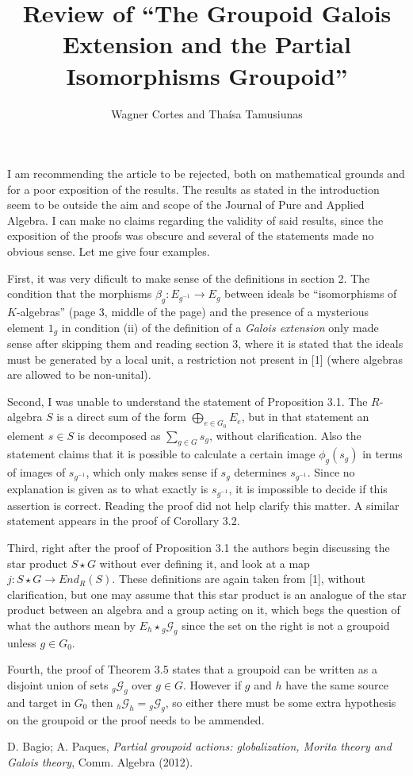 \documentclass[11pt,fleqn]{article}
\title{Review of 
``The Groupoid Galois Extension and the Partial
Isomorphisms Groupoid''}
\author{Wagner Cortes and Tha\'isa Tamusiunas}
\begin{document}
\maketitle

I am recommending the article to be rejected, both on mathematical grounds and
for a poor exposition of the results. The results as stated in the 
introduction seem to be outside the aim and scope of the Journal of Pure and 
Applied Algebra. I can make no claims regarding the validity of said results, 
since the exposition of the proofs was obscure and several of the statements
made no obvious sense. Let me give four examples.

First, it was very dificult to make sense of the definitions in section 2. 
The condition that the morphisms $\beta_g: E_{g^{-1}} \to E_g$ between ideals 
be ``isomorphisms of $K$-algebras'' (page 3, middle of the page) and the 
presence of a mysterious element $1_g$ in condition (ii) of the
definition of a \emph{Galois extension} only made sense after skipping them 
and reading section 3, where it is stated that the ideals must be 
generated by a local unit, a restriction not present in [1] (where algebras
are allowed to be non-unital). 

Second, I was unable to understand the statement of Proposition 3.1. The 
$R$-algebra $S$ is a direct sum of the form $\bigoplus_{e \in G_0} E_e$, but
in that statement an element $s \in S$ is decomposed as $\sum_{g \in G} s_g$,
without clarification. Also the statement claims that it is possible to 
calculate a certain image $\phi_g(s_g)$ in terms of images of $s_{g^{-1}}$, 
which only makes sense if $s_g$ determines $s_{g^{-1}}$. Since no explanation
is given as to what exactly is $s_{g^{-1}}$, it is impossible to decide if
this assertion is correct. Reading the proof did not help clarify this matter.
A similar statement appears in the proof of Corollary 3.2.

Third, right after the proof of Proposition 3.1 the authors begin discussing 
the star product $S \star G$ without ever defining it, and look at a map 
$j: S \star G \to End_R(S)$. These definitions are again taken from [1], 
without clarification, but one may assume that this star 
product is an analogue of the star product between an 
algebra and a group acting on it, which begs the question of what the authors 
mean by $E_h \star {}_g \mathcal G_g$ since the set on the right is not a 
groupoid unless $g \in G_0$.

Fourth, the proof of Theorem 3.5 states that a groupoid can be written as a 
disjoint union of sets ${}_g \mathcal G_g$ over $g \in G$. However if $g$ and
$h$ have the same source and target in $G_0$ then ${}_h \mathcal G_h = {}_g 
\mathcal G_g$, so either there must be some extra hypothesis on the groupoid 
or the proof needs to be ammended.

\bigskip

\noindent [1] D. Bagio; A. Paques, \emph{Partial groupoid actions: 
globalization, Morita theory and Galois theory}, Comm. Algebra (2012).
\end{document}
